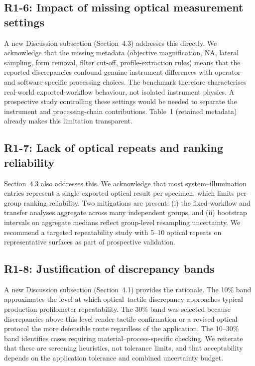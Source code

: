 \documentclass[10pt]{article}
\begin{document}
\subsection*{R1-6: Impact of missing optical measurement settings}
A new Discussion subsection (Section~4.3) addresses this directly. We acknowledge that the missing metadata (objective magnification, NA, lateral sampling, form removal, filter cut-off, profile-extraction rules) means that the reported discrepancies confound genuine instrument differences with operator- and software-specific processing choices. The benchmark therefore characterises real-world exported-workflow behaviour, not isolated instrument physics. A prospective study controlling these settings would be needed to separate the instrument and processing-chain contributions. Table~1 (retained metadata) already makes this limitation transparent.

\subsection*{R1-7: Lack of optical repeats and ranking reliability}
Section~4.3 also addresses this. We acknowledge that most system--illumination entries represent a single exported optical result per specimen, which limits per-group ranking reliability. Two mitigations are present: (i) the fixed-workflow and transfer analyses aggregate across many independent groups, and (ii) bootstrap intervals on aggregate medians reflect group-level resampling uncertainty. We recommend a targeted repeatability study with 5--10 optical repeats on representative surfaces as part of prospective validation.

\subsection*{R1-8: Justification of discrepancy bands}
A new Discussion subsection (Section~4.1) provides the rationale. The 10\% band approximates the level at which optical--tactile discrepancy approaches typical production profilometer repeatability. The 30\% band was selected because discrepancies above this level render tactile confirmation or a revised optical protocol the more defensible route regardless of the application. The 10--30\% band identifies cases requiring material--process-specific checking. We reiterate that these are screening heuristics, not tolerance limits, and that acceptability depends on the application tolerance and combined uncertainty budget.
\end{document}
